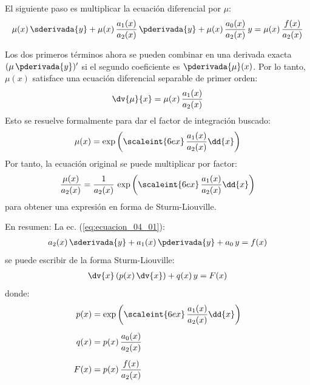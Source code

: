 El siguiente paso es multiplicar la ecuación diferencial por $\mu$:
\begin{align*}
\mu(x) \, \sderivada{y} + \mu(x) \, \dfrac{a_{1}(x)}{a_{2}(x)} \, \pderivada{y} + \mu(x) \, \dfrac{a_{0}(x)}{a_{2}(x)} \, y = \mu(x) \, \dfrac{f(x)}{a_{2}(x)}
\end{align*}

Los dos primeros términos ahora se pueden combinar en una derivada exacta $( \mu \, \pderivada{y})^{\prime}$  si el segundo coeficiente es $\pderivada{\mu} (x)$. Por lo tanto, $\mu (x)$ satisface una ecuación diferencial separable de primer orden:
\begin{align*}
\dv{\mu}{x} = \mu (x) \, \dfrac{a_{1}(x)}{a_{2} (x)}
\end{align*}
Esto se resuelve formalmente para dar el factor de integración buscado:
\begin{align*}
\mu (x) = \exp \left( \scaleint{6ex} \, \dfrac{a_{1}(x)}{a_{2}(x)} \dd{x} \right)
\end{align*}
Por tanto, la ecuación original se puede multiplicar por factor:
\begin{align*}
\dfrac{\mu(x)}{a_{2}(x)} = \dfrac{1}{a_{2}(x)} \, \exp \left( \scaleint{6ex} \, \dfrac{a_{1}(x)}{a_{2}(x)} \dd{x} \right)
\end{align*}
para obtener una expresión en forma de Sturm-Liouville.
\par
\noindent
En resumen: La ec. (\ref{eq:ecuacion_04_01}):
\begin{align}
a_{2} (x) \, \sderivada{y} + a_{1} (x) \, \pderivada{y} + a_{0} \, y = f(x)
\label{eq:ecuacion_04_07}
\end{align}
se puede escribir de la forma Sturm-Liouville:
\begin{align}
\dv{x} \left( p(x) \, \dv{x} \right) + q(x) \, y =  F(x)
\label{eq:ecuacion_04_08}
\end{align}
donde:
\begin{align}
\begin{aligned}
p(x) &= \exp \left( \scaleint{6ex} \, \dfrac{a_{1}(x)}{a_{2}(x)} \dd{x} \right) \\[0.5em]
q(x) &= p(x) \, \dfrac{a_{0}(x)}{a_{2}(x)} \\[0.5em]
F(x) &= p(x) \, \dfrac{f(x)}{a_{2}(x)}
\end{aligned}
\label{eq:ecuacion_04_09}
\end{align}

